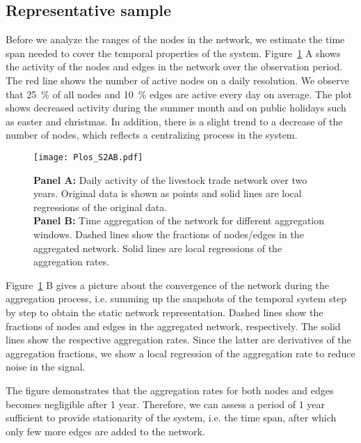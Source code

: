 \subsection{Representative sample}\label{sec:representative_sample}
Before we analyze the ranges of the nodes in the network, we estimate the time span needed to cover the temporal properties of the system.
Figure~\ref{fig:Plos_S1} A shows the activity of the nodes and edges in the network over the observation period.
The red line shows the number of active nodes on a daily resolution.
We observe that 25~\% of all nodes and 10~\% edges are active every day on average.
The plot shows decreased activity during the summer month and on public holidays such as easter and christmas.
In addition, there is a slight trend to a decrease of the number of nodes, which reflects a centralizing process in the system.
%
\begin{figure}[htbp]
\begin{center}
\texttt{[image: Plos\_S2AB.pdf]}
\caption{\textbf{Panel A:} Daily activity of the livestock trade network over two years.
Original data is shown as points and solid lines are local regressions of the original data.\\
\textbf{Panel B:} Time aggregation of the network for different aggregation windows.
Dashed lines show the fractions of nodes/edges in the aggregated network.
Solid lines are local regressions of the aggregation rates.
}
\label{fig:Plos_S1}
\end{center}
\end{figure}

Figure~\ref{fig:Plos_S1} B gives a picture about the convergence of the network during the aggregation process, i.e. summing up the snapshots of the temporal system step by step to obtain the static network representation.
Dashed lines show the fractions of nodes and edges in the aggregated network, respectively.
The solid lines show the respective aggregation rates.
Since the latter are derivatives of the aggregation fractions, we show a local regression of the aggregation rate to reduce noise in the signal.

The figure demonstrates that the aggregation rates for both nodes and edges becomes negligible after 1 year.
Therefore, we can assess a period of 1 year sufficient to provide stationarity of the system, i.e. the time span, after which only few more edges are added to the network.


